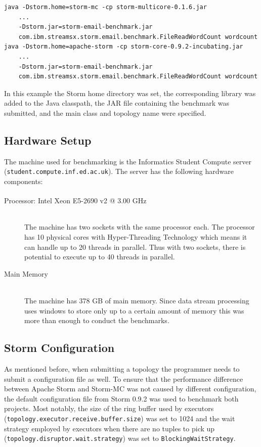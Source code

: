 \documentclass[bsc,logo,frontabs,twoside,singlespacing,normalheadings,parskip]{infthesis}\usepackage[]{graphicx}\usepackage[]{color}
\begin{document}
\begin{verbatim}
java -Dstorm.home=storm-mc -cp storm-multicore-0.1.6.jar
    ...
    -Dstorm.jar=storm-email-benchmark.jar
    com.ibm.streamsx.storm.email.benchmark.FileReadWordCount wordcount
java -Dstorm.home=apache-storm -cp storm-core-0.9.2-incubating.jar
    ...
    -Dstorm.jar=storm-email-benchmark.jar
    com.ibm.streamsx.storm.email.benchmark.FileReadWordCount wordcount
\end{verbatim}

In this example the Storm home directory was set, the corresponding library was added to the Java classpath, the JAR file containing the benchmark was submitted, and the main class and topology name were specified.

\subsection{Hardware Setup}

The machine used for benchmarking is the Informatics Student Compute server (\texttt{student.compute.inf.ed.ac.uk}). The server has the following hardware components:

\begin{description}
	\item[Processor: Intel\textsuperscript{\textregistered} Xeon\textsuperscript{\textregistered} E5-2690 v2 @ 3.00 GHz] \hfill \\
	The machine has two sockets with the same processor each. The processor has 10 physical cores with Hyper-Threading Technology which means it can handle up to 20 threads in parallel. Thus with two sockets, there is potential to execute up to 40 threads in parallel.
	\item[Main Memory] \hfill \\
	The machine has 378 GB of main memory. Since data stream processing uses windows to store only up to a certain amount of memory this was more than enough to conduct the benchmarks.
\end{description}

\subsection{Storm Configuration}

As mentioned before, when submitting a topology the programmer needs to submit a configuration file as well. To ensure that the performance difference between Apache Storm and Storm-MC was not caused by different configuration, the default configuration file from Storm 0.9.2 was used to benchmark both projects. Most notably, the size of the ring buffer used by executors \\ (\texttt{topology.executor.receive.buffer.size}) was set to 1024 and the wait strategy employed by executors when there are no tuples to pick up \\ (\texttt{topology.disruptor.wait.strategy}) was set to \texttt{BlockingWaitStrategy}.
\end{document}

